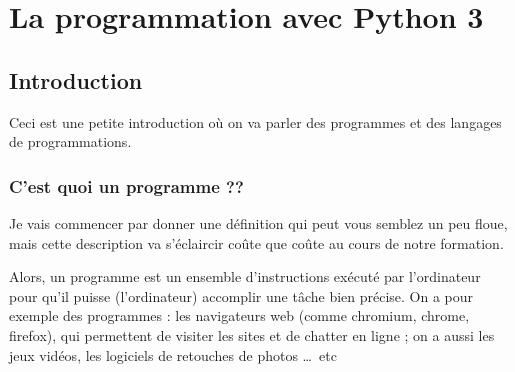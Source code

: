 \documentclass[12pt]{article}
\begin{document}
\clearpage
\renewcommand{\contentsname}{Sommaire}
\tableofcontents
\newpage


\section{La programmation avec Python 3}
    \subsection{Introduction}
        Ceci est une petite introduction où on va parler des programmes et des langages de programmations.
        \subsubsection{C'est quoi un programme ??}
            Je vais commencer par donner une définition qui peut vous semblez un peu floue, mais cette description
            va s'éclaircir coûte que coûte au cours de notre formation.

            Alors, un programme est un ensemble d'instructions exécuté par l'ordinateur pour qu'il puisse (l'ordinateur)
            accomplir une tâche bien précise. On a pour exemple des programmes : les navigateurs web
            (comme chromium, chrome, firefox), qui permettent de visiter les sites et de chatter en ligne ;
            on a aussi les jeux vidéos, les logiciels de retouches de photos \ldots\ etc
\end{document}

